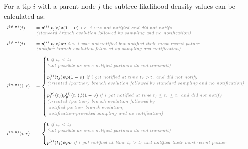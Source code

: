 \documentclass[a4paper,10pt]{article}
\begin{document}
For a tip $i$ with a parent node $j$ the subtree likelihood density values can be calculated as:
\begin{equation}
\scriptsize
\begin{array}{ll}
l^{(\not{n},\not{n})}(i) &= p^{(i)}(t_j)\psi\rho (1-\upsilon) \textit{\color{gray} ~i.e. $i$ was not notified and did not notify}\\
& \textit{\color{gray} (standard branch evolution followed by sampling and no notification)}\\
\\
l^{(\not{n},n)}(i) &= p_n^{(i)}(t_j)\psi\rho
\upsilon \textit{\color{gray} ~i.e. $i$ was not notified but notified their most recent patner}\\
& \textit{\color{gray} (notifier branch evolution followed by sampling and notification)}\\
\\
l^{(n,\not{n})}(i,r) &= \begin{cases}
0 \textit{\color{gray} ~if $t_r < t_j$}\\
\textit{\color{gray} (not possible as once notified partners do not transmit)}\\
\\
p_o^{(i)}(t_j)\psi\rho(1 - \upsilon) \textit{\color{gray} ~if $i$ got notified at time $t_r > t_i$ and did not notify}\\
\textit{\color{gray} (oriented (partner) branch evolution followed by standard sampling and no notification)}\\
\\
p_o^{(r)}(t_j) p_p^{(i)}(t_r) \phi (1-\upsilon) \textit{\color{gray} ~if $i$ got notified at time $t_j \leq t_r \leq t_i$ and did not notify}\\
\textit{\color{gray} (oriented (partner) branch evolution followed by} \\
\textit{\color{gray}~notified partner branch evolution,} \\
\textit{\color{gray}~notification-provoked sampling and no notification)}\\
\end{cases}\\
\\
l^{(n,n)}(i,r) &= \begin{cases}0 \textit{\color{gray} ~if $t_r < t_j$}\\
\textit{\color{gray} (not possible as once notified partners do not transmit)}\\
\\
p_n^{(i)}(t_j)\psi\rho\upsilon \textit{\color{gray} ~if $i$ got notified at time $t_r > t_i$ and notified their most recent patner}\\

\end{cases}
\end{array}
\end{equation}
\end{document}
